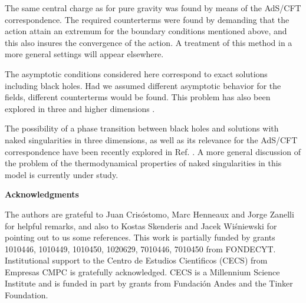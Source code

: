\documentclass[a4paper,12pt]{article}
\begin{document}
The same central charge as for pure gravity was found by means of the
AdS/CFT correspondence. The required counterterms were found by demanding that the 
action attain an extremum for the boundary conditions mentioned above,
and this also insures the convergence of the action. A treatment of this
method in a more general settings will appear elsewhere.

The asymptotic conditions considered here correspond to exact solutions
including black holes. Had we assumed different asymptotic behavior for the
fields, different counterterms would be found. This problem has also been explored
 in three and higher dimensions \cite{Nojiri:2000kh, deHaro:2000xn, Berg:2002hy}.

The possibility of a phase transition between black holes and solutions with
naked singularities \cite{Das:2001rk} in three dimensions, as well as its
relevance for the AdS/CFT correspondence have been recently explored
 in Ref. \cite{Das:2001wu}. A more general discussion of the problem of the
thermodynamical properties of naked singularities in this model is currently
under study.

\vskip 0.5cm \textbf{\large Acknowledgments}

The authors are grateful to Juan Cris\'ostomo, Marc Henneaux and Jorge Zanelli for
helpful remarks, and also to Kostas Skenderis and Jacek Wi\'sniewski for 
pointing out to us some references. This work is partially funded by grants 1010446, 1010449,
1010450, 1020629, 7010446, 7010450 from FONDECYT. Institutional support
 to the Centro de Estudios Cient\'{\i}ficos (CECS) from Empresas 
CMPC is gratefully acknowledged.  CECS is a Millennium Science 
Institute and is funded in part by grants from Fundaci\'{o}n Andes and 
the Tinker Foundation.
\end{document}
